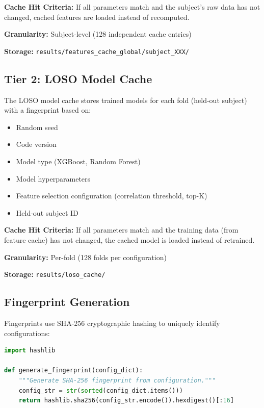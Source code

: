 \textbf{Cache Hit Criteria:} If all parameters match and the subject's raw data has not changed, cached features are loaded instead of recomputed.

\textbf{Granularity:} Subject-level (128 independent cache entries)

\textbf{Storage:} \texttt{results/features\_cache\_global/subject\_XXX/}

\subsection{Tier 2: LOSO Model Cache}
\label{subsec:loso_cache}

The LOSO model cache stores trained models for each fold (held-out subject) with a fingerprint based on:

\begin{itemize}
    \item Random seed
    \item Code version
    \item Model type (XGBoost, Random Forest)
    \item Model hyperparameters
    \item Feature selection configuration (correlation threshold, top-K)
    \item Held-out subject ID
\end{itemize}

\textbf{Cache Hit Criteria:} If all parameters match and the training data (from feature cache) has not changed, the cached model is loaded instead of retrained.

\textbf{Granularity:} Per-fold (128 folds per configuration)

\textbf{Storage:} \texttt{results/loso\_cache/}

\subsection{Fingerprint Generation}
\label{subsec:fingerprints}

Fingerprints use SHA-256 cryptographic hashing to uniquely identify configurations:

\begin{lstlisting}[language=Python]
import hashlib

def generate_fingerprint(config_dict):
    """Generate SHA-256 fingerprint from configuration."""
    config_str = str(sorted(config_dict.items()))
    return hashlib.sha256(config_str.encode()).hexdigest()[:16]
\end{lstlisting}

